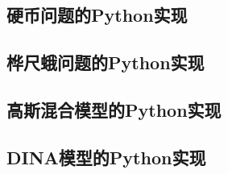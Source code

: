 \documentclass[a4paper,12pt]{ctexart} %
\begin{document}
\subsection{硬币问题的Python实现}\label{sec:coin_code}
\lstset{basicstyle=\footnotesize\ttfamily}


\subsection{桦尺蛾问题的Python实现}\label{sec:peppered_moths_code}
\lstset{basicstyle=\footnotesize\ttfamily}


\subsection{高斯混合模型的Python实现}\label{sec:gmm_code}
\lstset{basicstyle=\footnotesize\ttfamily}


\subsection{DINA模型的Python实现}\label{sec:dina_code}
\lstset{basicstyle=\footnotesize\ttfamily}

\end{document}
